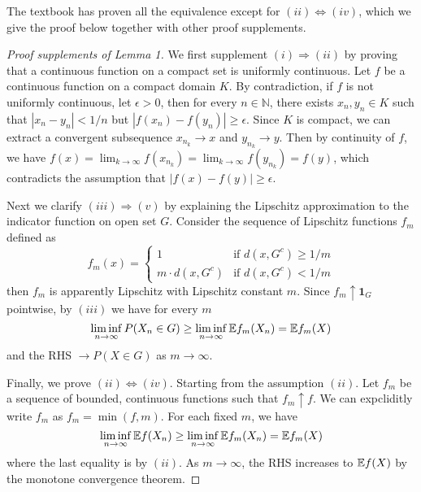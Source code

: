 \documentclass{article}
\begin{document}
The textbook has proven all the equivalence except for $(ii) \Leftrightarrow (iv)$, which we give the proof below together with other proof supplements.

\begin{proof}[Proof supplements of Lemma 1]
    We first supplement $(i) \Rightarrow (ii)$ by proving that a continuous function on a compact set is uniformly continuous. Let $f$ be a continuous function on a compact domain $K$. By contradiction, if $f$ is not uniformly continuous, let $\epsilon > 0$, then for every $n \in \mathbb{N}$, there exists $x_n, y_n \in K$ such that $|x_n - y_n| < 1/n$ but $|f(x_n) - f(y_n)| \geq \epsilon$. Since $K$ is compact, we can extract a convergent subsequence $x_{n_k} \to x$ and $y_{n_k} \to y$. Then by continuity of $f$, we have $f(x) = \lim_{k \to \infty} f(x_{n_k}) = \lim_{k \to \infty} f(y_{n_k}) = f(y)$, which contradicts the assumption that $|f(x) - f(y)| \geq \epsilon$.

    Next we clarify $(iii) \Rightarrow (v)$ by explaining the Lipschitz approximation to the indicator function on open set $G$. Consider the sequence of Lipschitz functions $f_m$ defined as
    \begin{equation}
        f_m(x) = \begin{cases}
            1 & \text{if } d(x, G^c) \geq 1/m \\
            m \cdot d(x, G^c) & \text{if } d(x, G^c) < 1/m
        \end{cases}
    \end{equation}
    then $f_m$ is apparently Lipschitz with Lipschitz constant $m$. Since $f_m \uparrow \mathbf{1}_G$ pointwise, by $(iii)$ we have for every $m$
    \begin{equation}
        \liminf_{n\to\infty} P(X_n \in G) \geq \liminf _{n\to\infty}\mathbb{E} f_m(X_n) = \mathbb{E} f_m(X)
    \end{equation}
    and the RHS $\to P(X \in G)$ as $m \to \infty$.

    Finally, we prove $(ii) \Leftrightarrow (iv)$. Starting from the assumption $(ii)$. Let $f_m$ be a sequence of bounded, continuous functions such that $f_m \uparrow f$. We can expcliditly write $f_m$ as $f_m = \min(f, m)$. For each fixed $m$, we have
    \begin{equation}
        \liminf_{n\to\infty} \mathbb{E} f(X_n) \geq \liminf_{n\to\infty} \mathbb{E} f_m(X_n) = \mathbb{E} f_m(X)
    \end{equation}
    where the last equality is by $(ii)$. As $m \to \infty$, the RHS increases to $\mathbb{E} f(X)$ by the monotone convergence theorem. 
    

\end{proof}
\end{document}
